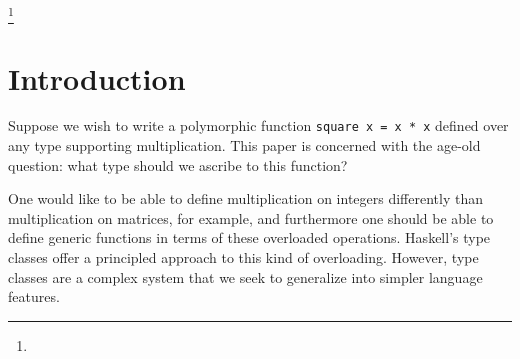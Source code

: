 \documentclass[acmlarge]{acmart}
\begin{document}
\newcommand\tmono{\tau}
\newcommand\tpoly{\sigma}
\newcommand\tvarempty{\epsilon_{\tpoly}}
\newcommand\tconst{\kappa}
\newcommand\tvar{\alpha}
\newcommand\tarrow[2]{#1 \rightarrow #2}
\newcommand\tforall[2]{\forall #1 \ . \ #2}
\newcommand\timp[2]{#1 \Rightarrow #2}
\newcommand\tforallimp[3]{\tforall{#1}{\timp{#2}{#3}}}
\newcommand\tgen[3]{\text{gen}\parens{#1, #2, #3}}
\newcommand\tinst[1]{\text{inst}(#1)}
\newcommand\tmgu[2]{\text{mgu}\parens{#1, #2}}

\newcommand\gcontext{\Gamma}
\newcommand\gempty{\epsilon_{\gcontext}}

\newcommand\icontext{\Delta}
\newcommand\iempty{\epsilon_{\icontext}}

\newcommand\sub[3]{#1 \left[ #2 \mapsto #3 \right]}
\newcommand\ssub{\theta}
\newcommand\sempty{\epsilon_{\ssub}}
\newcommand\slub[2]{#1 \vee #2}

\newcommand\utrans[2]{#1 \leadsto #2}
\newcommand\uelab[2]{#1 \hookrightarrow #2}
\newcommand\utovar[1]{\| #1 \|}



\terms{}



\thanks{
}


\maketitle

\section{Introduction}

  Suppose we wish to write a polymorphic function {\tt square x = x * x} defined over any type supporting multiplication. This paper is concerned with the age-old question: what type should we ascribe to this function?

  One would like to be able to define multiplication on integers differently than multiplication on matrices, for example, and furthermore one should be able to define generic functions in terms of these overloaded operations. Haskell's type classes \cite{typeclasses} offer a principled approach to this kind of overloading. However, type classes are a complex system that we seek to generalize into simpler language features.
\end{document}
